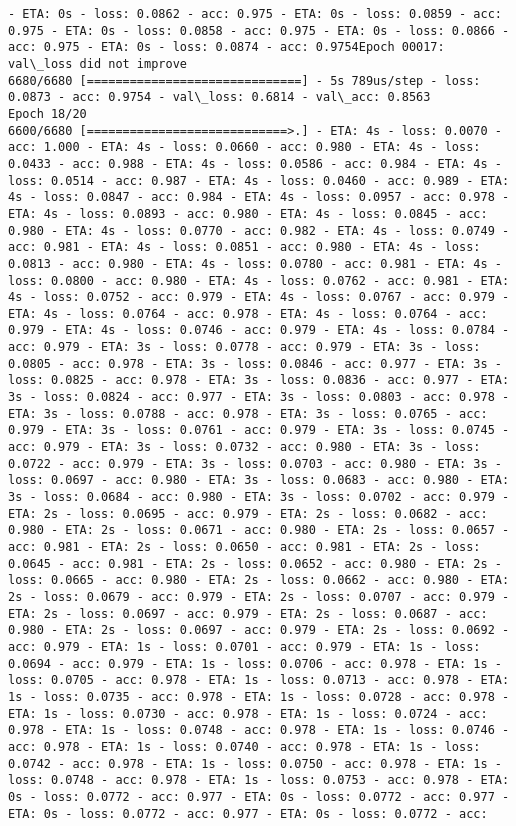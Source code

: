 \documentclass[11pt]{article}
\begin{document}
\begin{Verbatim}[commandchars=\\\{\}]
- ETA: 0s - loss: 0.0862 - acc: 0.975 - ETA: 0s - loss: 0.0859 - acc: 0.975 - ETA: 0s - loss: 0.0858 - acc: 0.975 - ETA: 0s - loss: 0.0866 - acc: 0.975 - ETA: 0s - loss: 0.0874 - acc: 0.9754Epoch 00017: val\_loss did not improve
6680/6680 [==============================] - 5s 789us/step - loss: 0.0873 - acc: 0.9754 - val\_loss: 0.6814 - val\_acc: 0.8563
Epoch 18/20
6600/6680 [============================>.] - ETA: 4s - loss: 0.0070 - acc: 1.000 - ETA: 4s - loss: 0.0660 - acc: 0.980 - ETA: 4s - loss: 0.0433 - acc: 0.988 - ETA: 4s - loss: 0.0586 - acc: 0.984 - ETA: 4s - loss: 0.0514 - acc: 0.987 - ETA: 4s - loss: 0.0460 - acc: 0.989 - ETA: 4s - loss: 0.0847 - acc: 0.984 - ETA: 4s - loss: 0.0957 - acc: 0.978 - ETA: 4s - loss: 0.0893 - acc: 0.980 - ETA: 4s - loss: 0.0845 - acc: 0.980 - ETA: 4s - loss: 0.0770 - acc: 0.982 - ETA: 4s - loss: 0.0749 - acc: 0.981 - ETA: 4s - loss: 0.0851 - acc: 0.980 - ETA: 4s - loss: 0.0813 - acc: 0.980 - ETA: 4s - loss: 0.0780 - acc: 0.981 - ETA: 4s - loss: 0.0800 - acc: 0.980 - ETA: 4s - loss: 0.0762 - acc: 0.981 - ETA: 4s - loss: 0.0752 - acc: 0.979 - ETA: 4s - loss: 0.0767 - acc: 0.979 - ETA: 4s - loss: 0.0764 - acc: 0.978 - ETA: 4s - loss: 0.0764 - acc: 0.979 - ETA: 4s - loss: 0.0746 - acc: 0.979 - ETA: 4s - loss: 0.0784 - acc: 0.979 - ETA: 3s - loss: 0.0778 - acc: 0.979 - ETA: 3s - loss: 0.0805 - acc: 0.978 - ETA: 3s - loss: 0.0846 - acc: 0.977 - ETA: 3s - loss: 0.0825 - acc: 0.978 - ETA: 3s - loss: 0.0836 - acc: 0.977 - ETA: 3s - loss: 0.0824 - acc: 0.977 - ETA: 3s - loss: 0.0803 - acc: 0.978 - ETA: 3s - loss: 0.0788 - acc: 0.978 - ETA: 3s - loss: 0.0765 - acc: 0.979 - ETA: 3s - loss: 0.0761 - acc: 0.979 - ETA: 3s - loss: 0.0745 - acc: 0.979 - ETA: 3s - loss: 0.0732 - acc: 0.980 - ETA: 3s - loss: 0.0722 - acc: 0.979 - ETA: 3s - loss: 0.0703 - acc: 0.980 - ETA: 3s - loss: 0.0697 - acc: 0.980 - ETA: 3s - loss: 0.0683 - acc: 0.980 - ETA: 3s - loss: 0.0684 - acc: 0.980 - ETA: 3s - loss: 0.0702 - acc: 0.979 - ETA: 2s - loss: 0.0695 - acc: 0.979 - ETA: 2s - loss: 0.0682 - acc: 0.980 - ETA: 2s - loss: 0.0671 - acc: 0.980 - ETA: 2s - loss: 0.0657 - acc: 0.981 - ETA: 2s - loss: 0.0650 - acc: 0.981 - ETA: 2s - loss: 0.0645 - acc: 0.981 - ETA: 2s - loss: 0.0652 - acc: 0.980 - ETA: 2s - loss: 0.0665 - acc: 0.980 - ETA: 2s - loss: 0.0662 - acc: 0.980 - ETA: 2s - loss: 0.0679 - acc: 0.979 - ETA: 2s - loss: 0.0707 - acc: 0.979 - ETA: 2s - loss: 0.0697 - acc: 0.979 - ETA: 2s - loss: 0.0687 - acc: 0.980 - ETA: 2s - loss: 0.0697 - acc: 0.979 - ETA: 2s - loss: 0.0692 - acc: 0.979 - ETA: 1s - loss: 0.0701 - acc: 0.979 - ETA: 1s - loss: 0.0694 - acc: 0.979 - ETA: 1s - loss: 0.0706 - acc: 0.978 - ETA: 1s - loss: 0.0705 - acc: 0.978 - ETA: 1s - loss: 0.0713 - acc: 0.978 - ETA: 1s - loss: 0.0735 - acc: 0.978 - ETA: 1s - loss: 0.0728 - acc: 0.978 - ETA: 1s - loss: 0.0730 - acc: 0.978 - ETA: 1s - loss: 0.0724 - acc: 0.978 - ETA: 1s - loss: 0.0748 - acc: 0.978 - ETA: 1s - loss: 0.0746 - acc: 0.978 - ETA: 1s - loss: 0.0740 - acc: 0.978 - ETA: 1s - loss: 0.0742 - acc: 0.978 - ETA: 1s - loss: 0.0750 - acc: 0.978 - ETA: 1s - loss: 0.0748 - acc: 0.978 - ETA: 1s - loss: 0.0753 - acc: 0.978 - ETA: 0s - loss: 0.0772 - acc: 0.977 - ETA: 0s - loss: 0.0772 - acc: 0.977 - ETA: 0s - loss: 0.0772 - acc: 0.977 - ETA: 0s - loss: 0.0772 - acc: 
\end{Verbatim}
\end{document}
